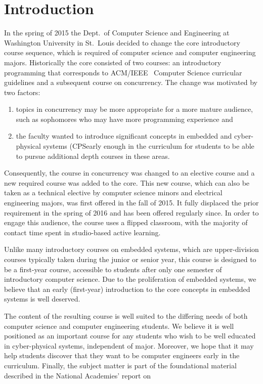\section{Introduction}
\label{sec:intro}

In the spring of 2015 the Dept.~of Computer Science and Engineering at Washington University in St.~Louis decided to change the core introductory course sequence, which is required of computer science and computer engineering majors.  Historically the core  consisted of two courses: an introductory programming that corresponds to ACM/IEEE~\cite{cs13} Computer Science curricular guidelines and a subsequent course on concurrency.  The change was motivated by two factors:
\begin{enumerate}
  \item topics in concurrency may be more appropriate for a more mature audience, such as sophomores who may have more programming experience and
  \item the faculty wanted to introduce significant concepts in embedded and cyber-physical systems (CPSearly enough in the curriculum for students to be able to pursue additional depth courses in these areas.
\end{enumerate}

Consequently, the course in concurrency was changed to an elective course and a new required course was added to the core.  This new course, which can also be taken as a technical elective by computer science minors and electrical engineering majors, was first offered in the fall of 2015.  It fully displaced the prior requirement in the spring of 2016 and has been offered regularly since.  In order to engage this audience, the course uses a flipped classroom, with the majority of contact time spent in studio-based active learning.

Unlike many introductory courses on embedded systems, which are upper-division courses typically taken during the junior or senior year, this course is designed to be a first-year course, accessible to students after only one semester of introductory computer science.  Due to the proliferation of embedded systems, we believe that an early (first-year) introduction to the core concepts in embedded systems is well deserved.

The content of the resulting course is well suited to the differing needs of both computer science and computer engineering students.  We believe it is well positioned as an important course for any students who wish to be well educated in cyber-physical systems, independent of major. Moreover, we hope that it may help students discover that they want to be computer engineers early in the curriculum. Finally, the subject matter is part of the foundational material described in the National Academies' report on 

